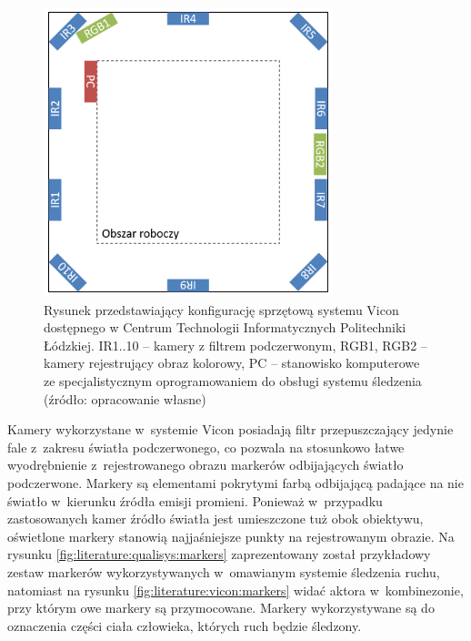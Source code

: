 \begin{savenotes}
										
	\begin{figure}[!htb]
		\centering	
		\includegraphics[width=0.75\textwidth]{images/viconSetup.png}
		\caption[Rysunek przedstawiający konfigurację sprzętową systemu Vicon dostępnego w Centrum Technologii Informatycznych Politechniki Łódzkiej]{Rysunek przedstawiający konfigurację sprzętową systemu Vicon dostępnego w Centrum Technologii Informatycznych Politechniki Łódzkiej. IR1..10 -- kamery z filtrem podczerwonym, RGB1, RGB2 -- kamery rejestrujący obraz kolorowy, PC -- stanowisko komputerowe ze specjalistycznym oprogramowaniem do obsługi systemu śledzenia (źródło: opracowanie własne)}
		\label{fig:literature:vicon:lutSetup}
	\end{figure}
									
\end{savenotes}
	
Kamery wykorzystane w~systemie Vicon posiadają filtr przepuszczający jedynie fale z~zakresu światła podczerwonego, co pozwala na stosunkowo łatwe wyodrębnienie z~rejestrowanego obrazu markerów odbijających światło podczerwone. Markery są elementami pokrytymi farbą odbijającą padające na nie światło w~kierunku źródła emisji promieni. Ponieważ w~przypadku zastosowanych kamer źródło światła jest umieszczone tuż obok obiektywu, oświetlone markery stanowią najjaśniejsze punkty na rejestrowanym obrazie. Na rysunku \ref{fig:literature:qualisys:markers} zaprezentowany został przykładowy zestaw markerów wykorzystywanych w~omawianym systemie śledzenia ruchu, natomiast na rysunku \ref{fig:literature:vicon:markers} widać aktora w~kombinezonie, przy którym owe markery są przymocowane. Markery wykorzystywane są do oznaczenia części ciała człowieka, których ruch będzie śledzony.
	
